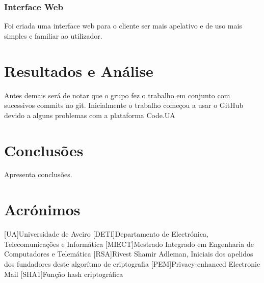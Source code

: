 \documentclass{report}
\begin{document}
\subsection{Interface Web}
Foi criada uma interface web para o cliente ser mais apelativo e de uso mais simples e familiar ao utilizador.

\chapter{Resultados e Análise}
\label{chap.resultados}

Antes demais será de notar que o grupo fez o trabalho em conjunto com sucessivos commits no git. Inicialmente o trabalho começou a usar o GitHub devido a alguns problemas com a plataforma Code.UA



\chapter{Conclusões}
\label{chap.conclusao}
Apresenta conclusões.


\chapter*{Acrónimos}
\begin{acronym}
 [UA]{Universidade de Aveiro}
 [DETI]{Departamento de Electrónica, Telecomunicações e Informática}
 [MIECT]{Mestrado Integrado em Engenharia de Computadores e Telemática}
 [RSA]{Rivest Shamir Adleman, Iniciais dos apelidos dos fundadores deste algorítmo de criptografia}
 [PEM]{Privacy-enhanced Electronic Mail}
 [SHA1]{Função hash criptográfica}
\end{acronym}


%
\end{document}

